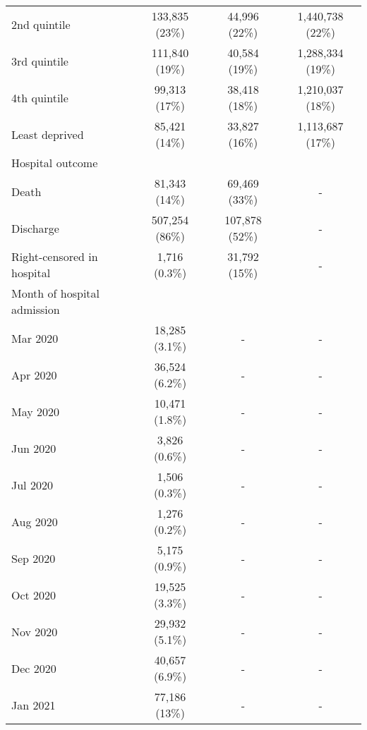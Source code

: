 \begin{longtable}[t]{lccc}
\hspace{1em}2nd quintile & 133,835 (23\%) & 44,996 (22\%) & 1,440,738 (22\%)\\
\hspace{1em}3rd quintile & 111,840 (19\%) & 40,584 (19\%) & 1,288,334 (19\%)\\
\hspace{1em}4th quintile & 99,313 (17\%) & 38,418 (18\%) & 1,210,037 (18\%)\\
\hspace{1em}Least deprived & 85,421 (14\%) & 33,827 (16\%) & 1,113,687 (17\%)\\
Hospital outcome &  &  & \\
\hspace{1em}Death & 81,343 (14\%) & 69,469 (33\%) & -\\
\hspace{1em}Discharge & 507,254 (86\%) & 107,878 (52\%) & -\\
\hspace{1em}Right-censored in hospital & 1,716 (0.3\%) & 31,792 (15\%) & -\\
Month of hospital admission &  &  & \\
\hspace{1em}Mar 2020 & 18,285 (3.1\%) & - & -\\
\hspace{1em}Apr 2020 & 36,524 (6.2\%) & - & -\\
\hspace{1em}May 2020 & 10,471 (1.8\%) & - & -\\
\hspace{1em}Jun 2020 & 3,826 (0.6\%) & - & -\\
\hspace{1em}Jul 2020 & 1,506 (0.3\%) & - & -\\
\hspace{1em}Aug 2020 & 1,276 (0.2\%) & - & -\\
\hspace{1em}Sep 2020 & 5,175 (0.9\%) & - & -\\
\hspace{1em}Oct 2020 & 19,525 (3.3\%) & - & -\\
\hspace{1em}Nov 2020 & 29,932 (5.1\%) & - & -\\
\hspace{1em}Dec 2020 & 40,657 (6.9\%) & - & -\\
\hspace{1em}Jan 2021 & 77,186 (13\%) & - & -\\

\end{longtable}
